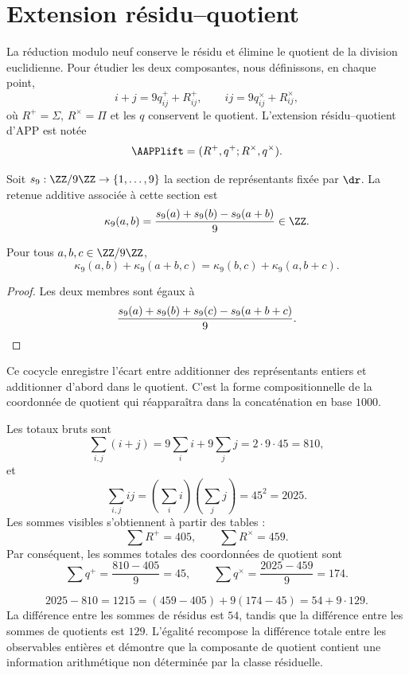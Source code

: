 \section{Extension résidu--quotient}

La réduction modulo neuf conserve le résidu et élimine le quotient de la
division euclidienne. Pour étudier les deux composantes, nous définissons, en chaque point,
\[
i+j=9q^+_{ij}+R^+_{ij},
\qquad
ij=9q^\times_{ij}+R^\times_{ij},
\]
où \(R^+=\Sigma\), \(R^\times=\Pi\) et les \(q\) conservent le quotient.
L'extension résidu--quotient d'APP est notée
\[
\AAPPlift=(R^+,q^+;R^\times,q^\times).
\]

Soit \(s_9:\ZZ/9\ZZ\to\{1,\ldots,9\}\) la section de représentants fixée
par \(\dr\). La retenue additive associée à cette section est
\[
 \kappa_9(a,b)
 =\frac{s_9(a)+s_9(b)-s_9(a+b)}9\in\ZZ.
\]

\begin{lemma}
\label{lem:app-cociclo-acarreo}
Pour tous \(a,b,c\in\ZZ/9\ZZ\),
\[
 \kappa_9(a,b)+\kappa_9(a+b,c)
 =\kappa_9(b,c)+\kappa_9(a,b+c).
\]
\end{lemma}

\begin{proof}
Les deux membres sont égaux à
\[
 \frac{s_9(a)+s_9(b)+s_9(c)-s_9(a+b+c)}9.\qedhere
\]
\end{proof}

Ce cocycle enregistre l'écart entre additionner des représentants entiers et
additionner d'abord dans le quotient. C'est la forme compositionnelle de la coordonnée de
quotient qui réapparaîtra dans la concaténation en base \(1000\).

Les totaux bruts sont
\[
\sum_{i,j}(i+j)
=9\sum_i i+9\sum_j j
=2\cdot9\cdot45
=810,
\]
et
\[
\sum_{i,j}ij
=\left(\sum_i i\right)\left(\sum_j j\right)
=45^2
=2025.
\]
Les sommes visibles s'obtiennent à partir des tables :
\[
\sum R^+=405,
\qquad
\sum R^\times=459.
\]
Par conséquent, les sommes totales des coordonnées de quotient sont
\[
\sum q^+=\frac{810-405}{9}=45,
\qquad
\sum q^\times=\frac{2025-459}{9}=174.
\]

\begin{exactbox}[title={Décomposition exacte de la différence intégrée}]
\[
\boxed{
2025-810
=1215
=(459-405)+9(174-45)
=54+9\cdot129.}
\]
La différence entre les sommes de résidus est \(54\), tandis que la
différence entre les sommes de quotients est \(129\). L'égalité recompose la
différence totale entre les observables entières et démontre que la composante
de quotient contient une information arithmétique non déterminée par la classe
résiduelle.
\end{exactbox}

